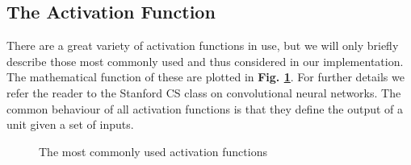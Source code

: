 \subsection{The Activation Function}

\noindent There are a great variety of activation functions in use, but we will only briefly describe those most commonly used and thus considered in our implementation. The mathematical function of these are plotted in \textbf{Fig. \ref{activationfuncs}}. For further details we refer the reader to the Stanford CS class on convolutional neural networks\cite{cs231n_part1}. The common behaviour of all activation functions is that they define the output of a unit given a set of inputs. \\
\begin{figure}[H]
    \begin{minipage}{0.3\textwidth}
    \end{minipage}
    \begin{minipage}{0.3\textwidth}
    \end{minipage}
    \begin{minipage}{0.3\textwidth}
    \end{minipage}
    \caption{The most commonly used activation functions}
    \label{activationfuncs}
\end{figure}

